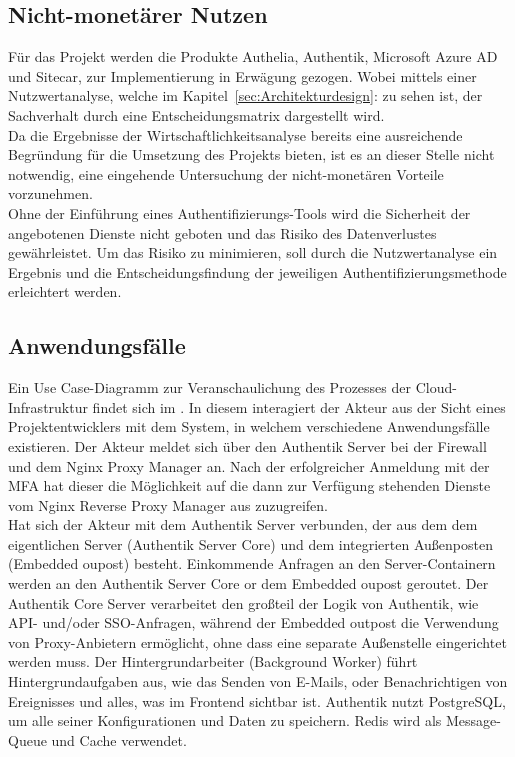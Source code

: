 \subsection{Nicht-monetärer Nutzen}
\label{sec:Nicht-monetärer Nutzen}
Für das Projekt werden die Produkte Authelia, Authentik, Microsoft Azure AD und Sitecar, zur Implementierung in Erwägung gezogen. 
Wobei mittels einer Nutzwertanalyse, welche im Kapitel~\ref{sec:Architekturdesign}:  zu sehen ist, der 
Sachverhalt durch eine Entscheidungsmatrix dargestellt wird.
\\Da die Ergebnisse der Wirtschaftlichkeitsanalyse bereits eine ausreichende Begründung für die Umsetzung des Projekts bieten, 
ist es an dieser Stelle nicht notwendig, eine eingehende Untersuchung der nicht-monetären Vorteile vorzunehmen.
\\Ohne der Einführung eines Authentifizierungs-Tools wird die Sicherheit der angebotenen Dienste nicht geboten und das Risiko des 
Datenverlustes gewährleistet. Um das Risiko zu minimieren, soll durch die Nutzwertanalyse ein Ergebnis und die Entscheidungsfindung 
der jeweiligen Authentifizierungsmethode erleichtert werden.


\subsection{Anwendungsfälle}
\label{sec:Anwendungsfaelle}
Ein Use Case-Diagramm zur Veranschaulichung des Prozesses der Cloud-Infrastruktur findet sich im .
In diesem interagiert der Akteur aus der Sicht eines Projektentwicklers mit dem System, in welchem verschiedene 
Anwendungsfälle existieren. Der Akteur meldet sich über den Authentik Server bei der Firewall und dem Nginx Proxy Manager an. 
Nach der erfolgreicher Anmeldung mit der \acs{MFA} hat dieser die Möglichkeit auf die dann zur Verfügung stehenden Dienste vom 
Nginx Reverse Proxy Manager aus zuzugreifen.
\\Hat sich der Akteur mit dem Authentik Server verbunden, der aus dem dem eigentlichen Server (Authentik Server Core) und dem 
integrierten Außenposten (Embedded oupost) besteht. Einkommende Anfragen an den Server-Containern werden an den Authentik Server Core 
or dem Embedded oupost geroutet. Der Authentik Core Server verarbeitet den großteil der Logik von Authentik, wie \zB API- und/oder 
\acs{SSO}-Anfragen, während der Embedded outpost die Verwendung von Proxy-Anbietern ermöglicht, ohne dass eine separate Außenstelle 
eingerichtet werden muss. Der Hintergrundarbeiter (Background Worker) führt Hintergrundaufgaben aus, wie das Senden von E-Mails, 
oder Benachrichtigen von Ereignisses und alles, was im Frontend sichtbar ist. Authentik nutzt PostgreSQL, um alle seiner 
Konfigurationen und Daten zu speichern. Redis wird als Message-Queue und Cache verwendet.